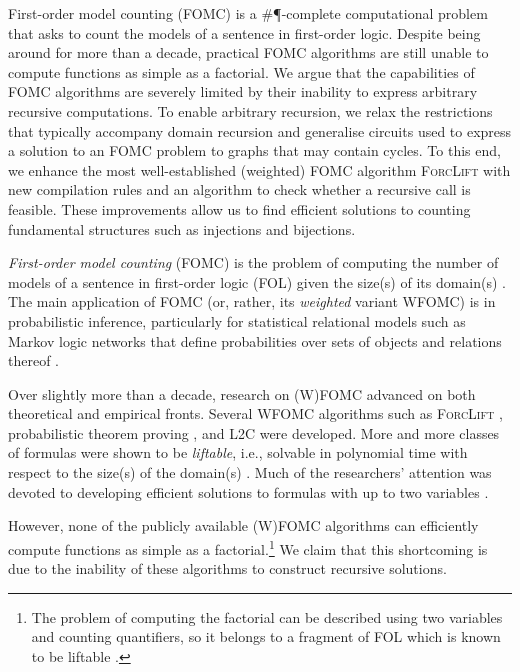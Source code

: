 First-order model counting (FOMC) is a \#\P-complete computational problem that
asks to count the models of a sentence in first-order logic. Despite being
around for more than a decade, practical FOMC algorithms are still unable to
compute functions as simple as a factorial. We argue that the capabilities of
FOMC algorithms are severely limited by their inability to express arbitrary
recursive computations. To enable arbitrary recursion, we relax the restrictions
that typically accompany domain recursion and generalise circuits used to
express a solution to an FOMC problem to graphs that may contain cycles. To this
end, we enhance the most well-established (weighted) FOMC algorithm
\textsc{ForcLift} \citep{DBLP:conf/ijcai/BroeckTMDR11} with new compilation
rules and an algorithm to check whether a recursive call is feasible. These
improvements allow us to find efficient solutions to counting fundamental
structures such as injections and bijections.


\emph{First-order model counting} (FOMC) is the problem of computing the number
of models of a sentence in first-order logic (FOL) given the size(s) of its
domain(s) \citep{DBLP:conf/ijcai/BroeckTMDR11}. The main application of FOMC
(or, rather, its \emph{weighted} variant WFOMC) is in probabilistic inference,
particularly for statistical relational models such as Markov logic networks
that define probabilities over sets of objects and relations thereof
\citep{DBLP:conf/ijcai/BroeckTMDR11,DBLP:journals/cacm/GogateD16}.

Over slightly more than a decade, research on (W)FOMC advanced on both
theoretical and empirical fronts. Several WFOMC algorithms such as
\textsc{ForcLift} \citep{DBLP:conf/ijcai/BroeckTMDR11}, probabilistic theorem
proving \citep{DBLP:journals/cacm/GogateD16}, and \textsc{L2C}
\citep{DBLP:conf/kr/KazemiP16} were developed. More and more classes of formulas
were shown to be \emph{liftable}, i.e., solvable in polynomial time with respect
to the size(s) of the domain(s)
\citep{DBLP:conf/kr/BremenK21,DBLP:conf/nips/KazemiKBP16,DBLP:conf/lics/KuusistoL18,DBLP:journals/jair/Kuzelka21}.
Much of the researchers' attention was devoted to developing efficient solutions
to formulas with up to two variables
\citep{DBLP:conf/uai/BremenK21,DBLP:journals/corr/abs-2110-05992}.


However, none of the publicly available (W)FOMC algorithms can efficiently
compute functions as simple as a factorial.\footnote{The problem of computing
  the factorial can be described using two variables and counting quantifiers,
  so it belongs to a fragment of FOL which is known to be liftable
  \citep{DBLP:journals/jair/Kuzelka21}.} We claim that this shortcoming is due
to the inability of these algorithms to construct recursive solutions.

